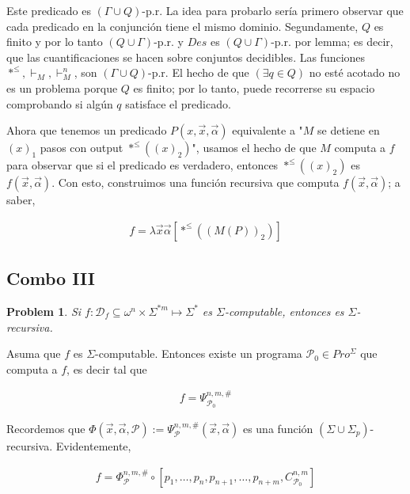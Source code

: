 \documentclass[a4paper, 12pt]{article}
\newtheorem{problem}{Problem}
\newtheorem{problem}{Problem}
\begin{document}
Este predicado es $(\Gamma \cup Q)$-p.r. La idea para probarlo sería primero
observar que cada predicado en la conjunción tiene el mismo dominio.
Segundamente, $Q$ es finito y por lo tanto $(Q \cup \Gamma)$-p.r. y $Des$ es $(Q
\cup \Gamma)$-p.r. por lemma; es decir, que las cuantificaciones se hacen sobre
conjuntos decidibles. Las funciones $*^{\leq}, \vdash_M, \vdash^n_M$, son
$(\Gamma \cup Q)$-p.r. El hecho de que $(\exists q \in Q)$ no esté acotado no es
un problema porque $Q$ es finito; por lo tanto, puede recorrerse su espacio
comprobando si algún $q$ satisface el predicado.

Ahora que tenemos un predicado $P(x, \vec{x}, \vec{\alpha})$ equivalente a "$M$
se detiene en $(x)_1$ pasos con output $*^{\leq}((x)_2)$", usamos el hecho de
que $M$ computa a $f$ para observar que si el predicado es verdadero, entonces
$*^{\leq}((x)_2)$ es $f(\vec{x}, \vec{\alpha}) $. Con esto, construimos una
función recursiva que computa $f(\vec{x}, \vec{\alpha}) $; a saber, 

\begin{align*}
    f = \lambda \vec{x}\vec{\alpha} \left[ *^{\leq} \left(\left( M(P)
        \right)_2\right)   \right]
\end{align*}

\pagebreak

\subsection{Combo III}

\begin{problem}
    Si $f : \mathcal{D}_f \subseteq \omega^{n} \times \Sigma^{*m} \mapsto
    \Sigma^{*}$ es $\Sigma$-computable, entonces es $\Sigma$-recursiva.
\end{problem}

Asuma que $f$ es $\Sigma$-computable. Entonces existe un programa $\mathcal{P}_0
\in Pro^{\Sigma}$ que computa a $f$, es decir tal que 

\begin{align*}
    f = \Psi_{\mathcal{P}_0}^{n, m, \#}
\end{align*}

Recordemos que $\Phi(\vec{x}, \vec{\alpha}, \mathcal{P}) :=
\Psi_{\mathcal{P}}^{n, m, \#}(\vec{x}, \vec{\alpha})$ es una función
$(\Sigma\cup \Sigma_p)$-recursiva. Evidentemente, 

\begin{align*}
    f = \Phi_{\mathcal{P}}^{n, m, \#} \circ \left[ p_1, \ldots, p_n, p_{n+1},
    \ldots, p_{n + m}, C_{\mathcal{P}_0}^{n, m}\right] 
\end{align*}
\end{document}
